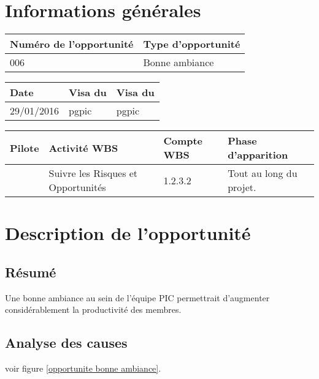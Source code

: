 \section*{Informations générales}
 
\begin{table}[h]
\centering
	\begin{tabularx}{16.8cm}{|X|X|}
	\hline
	\rowcolor{gray!40} Numéro de l'opportunité & Type d'opportunité \\
	\hline
	006 & Bonne ambiance \\
	\hline
	\end{tabularx}
\end{table}

\begin{table}[h]
\centering
	\begin{tabularx}{16.8cm}{|X|X|X|}
	\hline
	\rowcolor{gray!40} Date & Visa du \RQ & Visa du \CP \\
	\hline
	 29/01/2016 & pgpic & pgpic \\
	\hline
	\end{tabularx}
\end{table}

\begin{table}[h]
\centering
	\begin{tabularx}{16.8cm}{|X|X|X|X|}
	\hline
	\rowcolor{gray!40} Pilote & Activité WBS & Compte WBS & Phase d'apparition \\
	\hline
	 \Michel & Suivre les Risques et Opportunités & 1.2.3.2 & Tout au long du projet.\\
	\hline
	\end{tabularx}
\end{table}

\section*{Description de l'opportunité}

\subsection*{Résumé}
	Une bonne ambiance au sein de l'équipe PIC permettrait d'augmenter considérablement la productivité des membres. \\
	
\subsection*{Analyse des causes}
	voir figure \ref{opportunite bonne ambiance}.

